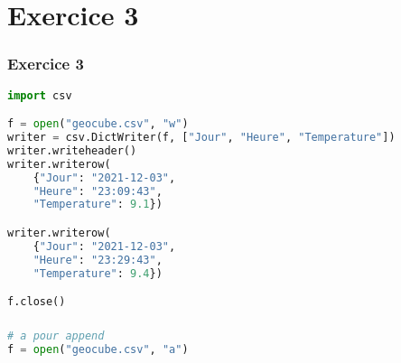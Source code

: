 \documentclass[svgnames,11pt]{beamer}
\begin{document}
\section{Exercice 3}
\begin{frame}[fragile]
    \frametitle{Exercice 3}

    \begin{center}
        \begin{lstlisting}[language=Python , basicstyle=\ttfamily\small, xleftmargin=1em, xrightmargin=0em]
import csv

f = open("geocube.csv", "w")
writer = csv.DictWriter(f, ["Jour", "Heure", "Temperature"])
writer.writeheader()
writer.writerow(
    {"Jour": "2021-12-03", 
    "Heure": "23:09:43", 
    "Temperature": 9.1})

writer.writerow(
    {"Jour": "2021-12-03", 
    "Heure": "23:29:43", 
    "Temperature": 9.4})

f.close()    
\end{lstlisting}
    \end{center}

\end{frame}
\begin{frame}[fragile]
    \frametitle{}

    \begin{center}
        \begin{lstlisting}[language=Python , basicstyle=\ttfamily\small, xleftmargin=2em, xrightmargin=2em]
# a pour append
f = open("geocube.csv", "a")
\end{lstlisting}
        \label{CODE}
    \end{center}

\end{frame}
\end{document}
